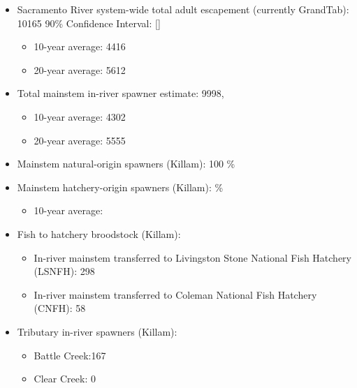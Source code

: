\documentclass[
]{book}
\providecommand{\tightlist}{%
  \setlength{\itemsep}{0pt}\setlength{\parskip}{0pt}}
\theoremstyle{definition}
\theoremstyle{definition}
\theoremstyle{definition}
\theoremstyle{definition}
\theoremstyle{remark}
\begin{document}
\begin{itemize}
\tightlist
\item
  Sacramento River system-wide total adult escapement (currently GrandTab): 10165 90\% Confidence Interval: {[}{]}

  \begin{itemize}
  \tightlist
  \item
    10-year average: 4416
  \item
    20-year average: 5612
  \end{itemize}
\item
  Total mainstem in-river spawner estimate: 9998,

  \begin{itemize}
  \tightlist
  \item
    10-year average: 4302
  \item
    20-year average: 5555
  \end{itemize}
\item
  Mainstem natural-origin spawners (Killam): 100 \%
\item
  Mainstem hatchery-origin spawners (Killam): \%

  \begin{itemize}
  \tightlist
  \item
    10-year average:
  \end{itemize}
\item
  Fish to hatchery broodstock (Killam):

  \begin{itemize}
  \tightlist
  \item
    In-river mainstem transferred to Livingston Stone National Fish Hatchery (LSNFH): 298
  \item
    In-river mainstem transferred to Coleman National Fish Hatchery (CNFH): 58
  \end{itemize}
\item
  Tributary in-river spawners (Killam):

  \begin{itemize}
  \tightlist
  \item
    Battle Creek:167
  \item
    Clear Creek: 0
  \end{itemize}
\end{itemize}
\end{document}
